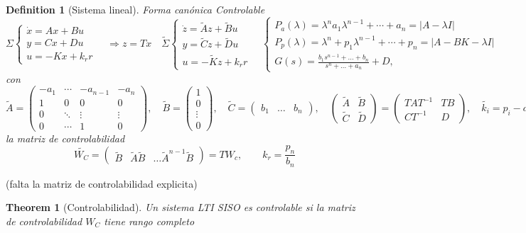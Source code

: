 \documentclass[leqno]{article}
\newtheorem*{theorem}{Theorem}
\newtheorem*{definition}{Definition}
\begin{document}
\begin{definition}[Sistema lineal] Forma canónica Controlable
\[
\Sigma  \begin{cases}
  \dot{x}=Ax + Bu \\ 
  y = Cx + Du\\
  u = -Kx+k_rr
\end{cases}
\quad \Rightarrow z=Tx \quad 
\tilde{\Sigma }  \begin{cases}
  \dot{z} = \tilde{A}z + \tilde{B}u \\
  y = \tilde{C} z + \tilde{D}u\\
  u = -\tilde{K}z + k_rr
\end{cases}
\quad \begin{cases}
 P_a(\lambda) = \lambda^n a_1 \lambda^{n-1} + \cdots + a_n = |A-\lambda I|\\
 P_{p}(\lambda) = \lambda^n + p_1\lambda^{n-1} + \cdots +  p_n = |A-BK-\lambda I|\\
 G(s) = \frac{b_1s ^{n-1}+ \ldots + b_n}{ s^n + \ldots+ a_n} + D,
\end{cases}
\] 
con 
\[
  \tilde{A} = \begin{pmatrix} -a_1 & \cdots & -a_{n-1} & -a_n \\ 1 & 0 & 0 & 0 \\ 0 & \ddots & \vdots & \vdots \\ 0 & \cdots & 1 & 0  \end{pmatrix}, \quad \tilde{B} = \begin{pmatrix} 1\\ 0 \\ \vdots \\0 \end{pmatrix}, \quad \tilde{C} = \begin{pmatrix} b_1 & \ldots & b_n \end{pmatrix}, \quad \begin{pmatrix} \tilde{A} & \tilde{B} \\ \tilde{C} & \tilde{D} \end{pmatrix}  = \begin{pmatrix} TAT^{-1} & TB \\ CT^{-1} & D \end{pmatrix}, \quad \tilde{k_i} = p_i-a_i
\] 
la matriz de controlabilidad
\[
  \tilde{W_C} = \begin{pmatrix} \tilde{B} & \tilde{A}\tilde{B} & \ldots \tilde{A}^{n-1}\tilde{B} \end{pmatrix} = TW_c,  \qquad k_r = \frac{p_n}{b_n}
\] 
\end{definition}

(falta la matriz de controlabilidad explicita)

\begin{theorem}[Controlabilidad] Un sistema LTI SISO es controlable si la matriz de controlabilidad $W_C$ tiene rango completo
\end{theorem}
\end{document}
